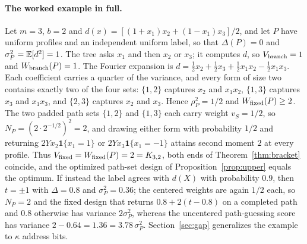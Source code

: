 \paragraph{The worked example in full.}
Let $m=3$, $b=2$ and $d(x)=[(1+x_1)x_2+(1-x_1)x_3]/2$, and let $P$ have uniform profiles and an independent uniform label, so that $\Delta(P)=0$ and $\sigma_P^2=\mathbb{E}[d^2]=1$. The tree asks $x_1$ and then $x_2$ or $x_3$; it computes $d$, so $V_{\rm branch}=1$ and $W_{\rm branch}(P)=1$. The Fourier expansion is $d=\tfrac12x_2+\tfrac12x_3+\tfrac12x_1x_2-\tfrac12x_1x_3$. Each coefficient carries a quarter of the variance, and every form of size two contains exactly two of the four sets: $\{1,2\}$ captures $x_2$ and $x_1x_2$, $\{1,3\}$ captures $x_3$ and $x_1x_3$, and $\{2,3\}$ captures $x_2$ and $x_3$. Hence $\rho_P^2=1/2$ and $W_{\rm fixed}(P)\ge2$. The two padded path sets $\{1,2\}$ and $\{1,3\}$ each carry weight $v_S=1/2$, so $N_P=(2\cdot2^{-1/2})^2=2$, and drawing either form with probability $1/2$ and returning $2Yx_2\mathbf1\{x_1=1\}$ or $2Yx_3\mathbf1\{x_1=-1\}$ attains second moment $2$ at every profile. Thus $V_{\rm fixed}=W_{\rm fixed}(P)=2=K_{3,2}$, both ends of Theorem~\ref{thm:bracket} coincide, and the optimized path-set design of Proposition~\ref{prop:upper} equals the optimum. If instead the label agrees with $d(X)$ with probability $0.9$, then $t=\pm1$ with $\Delta=0.8$ and $\sigma_P^2=0.36$; the centered weights are again $1/2$ each, so $N_P=2$ and the fixed design that returns $0.8+2(t-0.8)$ on a completed path and $0.8$ otherwise has variance $2\sigma_P^2$, whereas the uncentered path-guessing score has variance $2-0.64=1.36=3.78\,\sigma_P^2$. Section~\ref{sec:gap} generalizes the example to $\kappa$ address bits.

